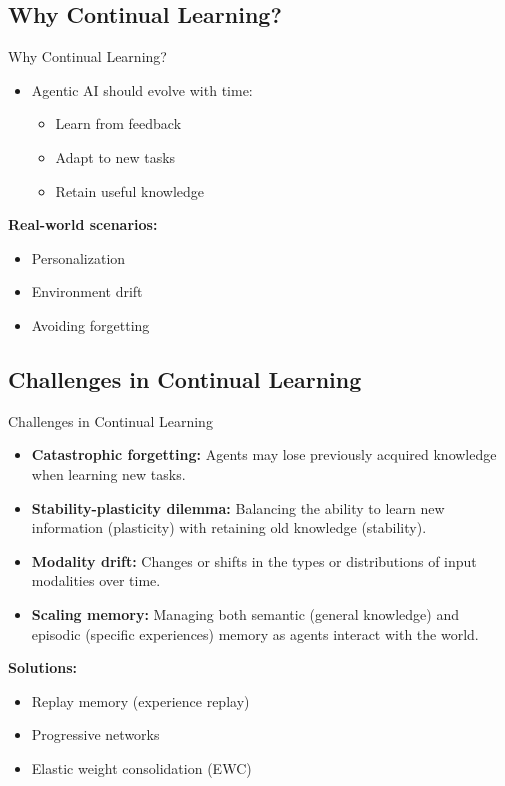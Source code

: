 \subsection{Why Continual Learning?}
\begin{frame}{Why Continual Learning?}
    \begin{itemize}
        \item Agentic AI should evolve with time:
        \begin{itemize}
            \item Learn from feedback
            \item Adapt to new tasks
            \item Retain useful knowledge
        \end{itemize}
    \end{itemize}
    \vspace{1em}
    \textbf{\faGlobe\hspace{0.5em}Real-world scenarios:}
    \begin{itemize}
        \item Personalization
        \item Environment drift
        \item Avoiding forgetting
    \end{itemize}
\end{frame}


\subsection{Challenges in Continual Learning}
\begin{frame}[allowframebreaks]{Challenges in Continual Learning}
    \begin{itemize}
        \item \textbf{Catastrophic forgetting:} Agents may lose previously acquired knowledge when learning new tasks.
        \item \textbf{Stability-plasticity dilemma:} Balancing the ability to learn new information (plasticity) with retaining old knowledge (stability).
        \item \textbf{Modality drift:} Changes or shifts in the types or distributions of input modalities over time.
        \item \textbf{Scaling memory:} Managing both semantic (general knowledge) and episodic (specific experiences) memory as agents interact with the world.
    \end{itemize}
    \vspace{1em}
    \textbf{\faWrench\hspace{0.5em}Solutions:}
    \begin{itemize}
        \item Replay memory (experience replay)
        \item Progressive networks
        \item Elastic weight consolidation (EWC)
    \end{itemize}
\end{frame}


